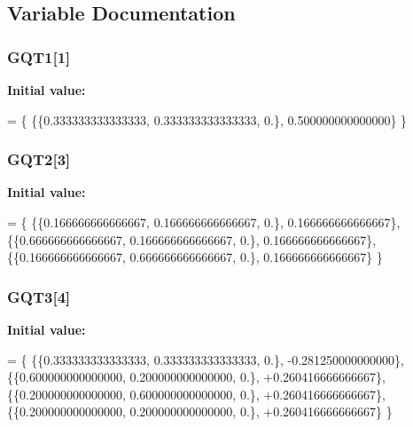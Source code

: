\subsection{Variable Documentation}
\subsubsection[{G\-Q\-T1}]{ G\-Q\-T1[1]}\label{GaussQuadratureTri_8cc_aeceb706d3f538f6fd894f2cca342ce5a}
{\bfseries Initial value\-:}
\begin{DoxyCode}
= \{ 
  \{\{0.333333333333333, 0.333333333333333, 0.\}, 0.500000000000000\}
\}
\end{DoxyCode}
\subsubsection[{G\-Q\-T2}]{ G\-Q\-T2[3]}\label{GaussQuadratureTri_8cc_aa673e2a9ad7b91fe634813409d31aec0}
{\bfseries Initial value\-:}
\begin{DoxyCode}
= \{
  \{\{0.166666666666667, 0.166666666666667, 0.\}, 0.166666666666667\},
  \{\{0.666666666666667, 0.166666666666667, 0.\}, 0.166666666666667\},
  \{\{0.166666666666667, 0.666666666666667, 0.\}, 0.166666666666667\}
\}
\end{DoxyCode}
\subsubsection[{G\-Q\-T3}]{ G\-Q\-T3[4]}\label{GaussQuadratureTri_8cc_ad7623b8877e36488352abf81ac66b203}
{\bfseries Initial value\-:}
\begin{DoxyCode}
= \{
  \{\{0.333333333333333, 0.333333333333333, 0.\}, -0.281250000000000\},
  \{\{0.600000000000000, 0.200000000000000, 0.\}, +0.260416666666667\},
  \{\{0.200000000000000, 0.600000000000000, 0.\}, +0.260416666666667\},
  \{\{0.200000000000000, 0.200000000000000, 0.\}, +0.260416666666667\}
\}
\end{DoxyCode}
